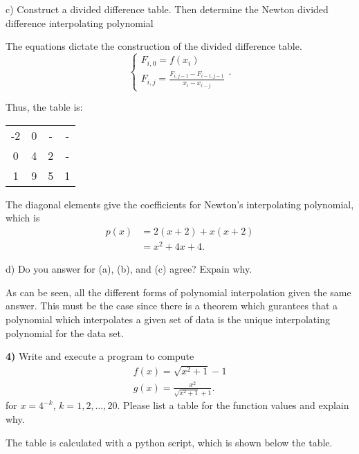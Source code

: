 \documentclass[12pt,a4paper]{article}
\newcommand{\prob}[2]{\textbf{#1)} #2}
\begin{document}
c) Construct a divided difference table.
Then determine the Newton divided difference interpolating polynomial

The equations dictate the construction of the divided difference table.
\[
\begin{cases}
    F_{i,0} = f\left( x_{i} \right) \\
    F_{i,j} = \frac{F_{i,j-1} - F_{i-1,j-1}}{x_{i} - x_{i-j}}
\end{cases}
.\]

Thus, the table is:

\begin{table}[H]
   \begin{center}
       \begin{tabular}{c||c|c|c}
           -2 & 0 & - & - \\
           0 & 4 & 2 & - \\
           1 & 9 & 5 & 1
       \end{tabular}
   \end{center} 
\end{table}

The diagonal elements give the coefficients for Newton's interpolating polynomial, which is
\begin{align*}
    p\left( x \right) &= 2\left( x+2 \right) + x\left( x+2 \right) \\
    &= x^2 + 4x + 4 
.\end{align*}

d) Do you answer for (a), (b), and (c) agree? Expain why.

As can be seen, all the different forms of polynomial interpolation given the same answer.
This must be the case since there is a theorem which gurantees that a polynomial which interpolates a given set of data is the unique interpolating polynomial for the data set.

\prob{4}{Write and execute a program to compute
    \begin{align*}
     f\left( x \right) = \sqrt{x^2 + 1} - 1 \\
     g\left( x \right) = \frac{x^2}{\sqrt{x^2 + 1} + 1} 
    .\end{align*}
for $x=4^{-k}$, $k=1,2,\ldots,20$. Please list a table for the function values and explain why.}

The table is calculated with a python script, which is shown below the table.

\begin{table}[H]
    \begin{center}
         
    \end{center}
\end{table}
\end{document}
